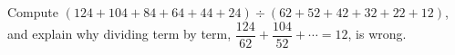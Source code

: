 Compute $(124+104+84+64+44+24)\div(62+52+42+32+22+12)$, and explain why dividing term by term, $\dfrac{124}{62}+\dfrac{104}{52}+\cdots=12$, is wrong.
